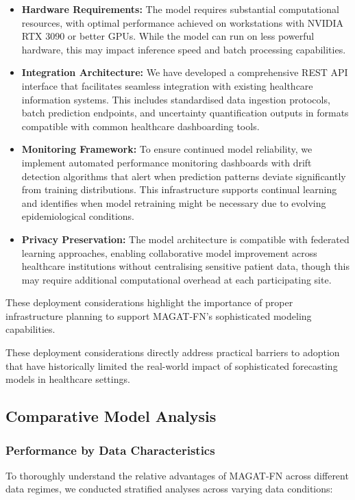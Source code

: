 \documentclass[lettersize, journal]{IEEEtran}
\begin{document}
\begin{itemize}
    \item \textbf{Hardware Requirements:} The model requires substantial computational resources, with optimal performance achieved on workstations with NVIDIA RTX 3090 or better GPUs. While the model can run on less powerful hardware, this may impact inference speed and batch processing capabilities.
    
    \item \textbf{Integration Architecture:} We have developed a comprehensive REST API interface that facilitates seamless integration with existing healthcare information systems. This includes standardised data ingestion protocols, batch prediction endpoints, and uncertainty quantification outputs in formats compatible with common healthcare dashboarding tools.
    
    \item \textbf{Monitoring Framework:} To ensure continued model reliability, we implement automated performance monitoring dashboards with drift detection algorithms that alert when prediction patterns deviate significantly from training distributions. This infrastructure supports continual learning and identifies when model retraining might be necessary due to evolving epidemiological conditions.
    
    \item \textbf{Privacy Preservation:} The model architecture is compatible with federated learning approaches, enabling collaborative model improvement across healthcare institutions without centralising sensitive patient data, though this may require additional computational overhead at each participating site.
\end{itemize}

These deployment considerations highlight the importance of proper infrastructure planning to support MAGAT-FN's sophisticated modeling capabilities.

These deployment considerations directly address practical barriers to adoption that have historically limited the real-world impact of sophisticated forecasting models in healthcare settings.

\subsection{Comparative Model Analysis}

\subsubsection{Performance by Data Characteristics}
To thoroughly understand the relative advantages of MAGAT-FN across different data regimes, we conducted stratified analyses across varying data conditions:
\end{document}
